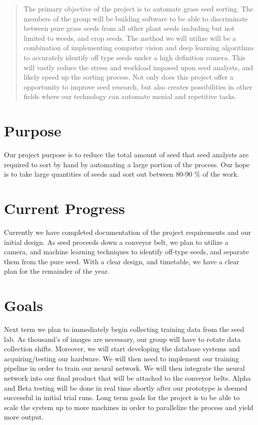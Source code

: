 \documentclass[onecolumn, draftclsnofoot,10pt, compsoc]{IEEEtran}
\begin{document}
\begin{titlepage}
\begin{singlespace}
\begin{abstract}
        	The primary objective of the project is to automate grass seed sorting. The members of the group will be building software to be able to discriminate between pure grass seeds from all other plant seeds including but not limited to weeds, and crop seeds. The method we will utilize will be a combination of implementing computer vision and deep learning algorithms to accurately identify off type seeds under a high definition camera. This will vastly reduce the stress and workload imposed upon seed analysts, and likely speed up the sorting process. Not only does this project offer a opportunity to improve seed research, but also creates possibilities in other fields where our technology can automate menial and repetitive tasks.
        \end{abstract}     
    \end{singlespace}
\end{titlepage}
\newpage
{}
\tableofcontents
\clearpage

\section{Purpose}
Our project purpose is to reduce the total amount of seed that seed analysts are required to sort by hand by automating a large portion of the process. Our hope is to take large quantities of seeds and sort out between 80-90 \% of the work.

\section{Current Progress}

Currently we have completed documentation of the project requirements and our initial design. As seed proceeds down a conveyor belt, we plan to utilize a camera, and machine learning techniques to identify off-type seeds, and separate them from the pure seed. With a clear design, and timetable, we have a clear plan for the remainder of the year. 

\section{Goals}
Next term we plan to immediately begin collecting training data from the seed lab. As thousand's of images are necessary, our group will have to rotate data collection shifts. Moreover, we will start developing the database systems and acquiring/testing our hardware. We will then need to implement our training pipeline in order to train our neural network. We will then integrate the neural network into our final product that will be attached to the conveyor belts. Alpha and Beta testing will be done in real time shortly after our prototype is deemed successful in initial trial runs. Long term goals for the project is to be able to scale the system up to more machines in order to parallelize the process and yield more output. 
\end{document}
